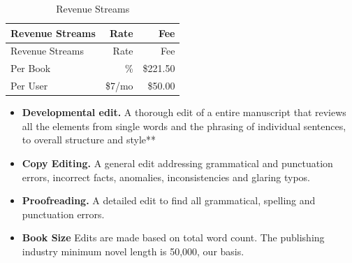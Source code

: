\documentclass[10pt,openany]{book}
\begin{document}
\begin{longtable}[]{@{}lrr@{}}
\caption{Revenue Streams}\tabularnewline
\toprule
\begin{minipage}[b]{0.30\columnwidth}\raggedright
Revenue Streams\strut
\end{minipage} & \begin{minipage}[b]{0.18\columnwidth}\raggedleft
Rate\strut
\end{minipage} & \begin{minipage}[b]{0.11\columnwidth}\raggedleft
Fee\strut
\end{minipage}\tabularnewline
\midrule
\endfirsthead
\toprule
\begin{minipage}[b]{0.30\columnwidth}\raggedright
Revenue Streams\strut
\end{minipage} & \begin{minipage}[b]{0.18\columnwidth}\raggedleft
Rate\strut
\end{minipage} & \begin{minipage}[b]{0.11\columnwidth}\raggedleft
Fee\strut
\end{minipage}\tabularnewline
\midrule
\endhead
\begin{minipage}[t]{0.30\columnwidth}\raggedright
Per Book\strut
\end{minipage} & \begin{minipage}[t]{0.18\columnwidth}\raggedleft
10\%\strut
\end{minipage} & \begin{minipage}[t]{0.11\columnwidth}\raggedleft
\$221.50\strut
\end{minipage}\tabularnewline
\begin{minipage}[t]{0.30\columnwidth}\raggedright
Per User\strut
\end{minipage} & \begin{minipage}[t]{0.18\columnwidth}\raggedleft
\$7/mo\strut
\end{minipage} & \begin{minipage}[t]{0.11\columnwidth}\raggedleft
\$50.00\strut
\end{minipage}\tabularnewline
\bottomrule
\end{longtable}

\begin{itemize}
\item
  \textbf{Developmental edit.} A thorough edit of a entire manuscript
  that reviews all the elements from single words and the phrasing of
  individual sentences, to overall structure and style**
\item
  \textbf{Copy Editing.} A general edit addressing grammatical and
  punctuation errors, incorrect facts, anomalies, inconsistencies and
  glaring typos.
\item
  \textbf{Proofreading.} A detailed edit to find all grammatical,
  spelling and punctuation errors.
\item
  \textbf{Book Size} Edits are made based on total word count. The
  publishing industry minimum novel length is 50,000, our basis.
\end{itemize}
\end{document}
